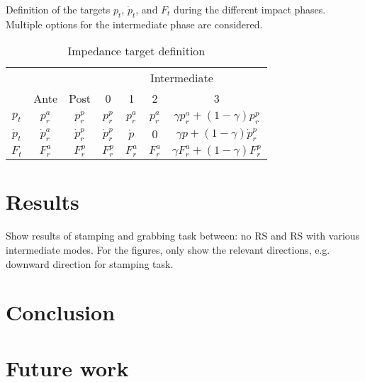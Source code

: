 \documentclass[a4paper, 10pt, conference]{ieeeconf}
\begin{document}
    \begin{table}[h]
      \caption{Impedance target definition}{Definition of the targets $p_t$, $\dot{p}_t$, and $F_t$ during the different impact phases. Multiple options for the intermediate phase are considered.}

    \label{target_defs}
      \centering
    \begin{tabular}{ccc|cccc|}
    \cline{4-7}
                                      &                                    &               & \multicolumn{4}{c|}{Intermediate}                                              \\ \cline{2-7} 
    \multicolumn{1}{c|}{}             & \multicolumn{1}{c|}{Ante}          & Post          & 0             & 1         & 2             & 3                                  \\ \hline
    \multicolumn{1}{|c|}{$p_t$}       & \multicolumn{1}{c|}{$p^a_r$}       & $p^p_r$       & $p^p_r$       & $p^a_r$   & $p^a_r$       & $\gamma p^a_r+(1-\gamma)p^p_r$     \\
    \multicolumn{1}{|c|}{$\dot{p}_t$} & \multicolumn{1}{c|}{$\dot{p}^a_r$} & $\dot{p}^p_r$ & $\dot{p}^p_r$ & $\dot{p}$ & $0$ & $\gamma p + (1-\gamma)\dot{p}^p_r$ \\
    \multicolumn{1}{|c|}{$F_t$}       & \multicolumn{1}{c|}{$F^a_r$}       & $F^p_r$       & $F^p_r$       & $F^a_r$   & $F^a_r$       & $\gamma F^a_r + (1-\gamma)F^p_r$   \\ \hline
    \end{tabular}
    \end{table}

    \section{Results}
    Show results of stamping and grabbing task between: no RS and RS with various intermediate modes. For the figures, only show the relevant directions, e.g. downward direction for stamping task.

    \section{Conclusion}

    \section{Future work}
\end{document}
